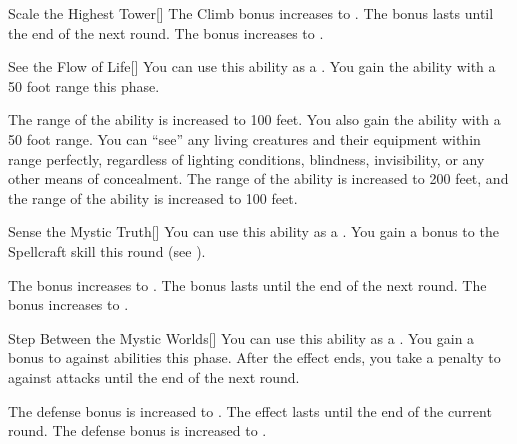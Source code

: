 {\begin{freeability}{Scale the Highest Tower}[]
                \rankline
                 The Climb bonus increases to .
                 The bonus lasts until the end of the next round.
                 The bonus increases to .
            \end{freeability}

            \begin{freeability}{See the Flow of Life}[]
                You can use this ability as a .
                You gain the  ability with a 50 foot range this phase.

                \rankline
                 The range of the  ability is increased to 100 feet.
                 You also gain the  ability with a 50 foot range.
                You can ``see'' any living creatures and their equipment within range perfectly, regardless of lighting conditions, blindness, invisibility, or any other means of concealment.
                 The range of the  ability is increased to 200 feet, and the range of the  ability is increased to 100 feet.
            \end{freeability}

            \begin{freeability}{Sense the Mystic Truth}[]
                You can use this ability as a .
                You gain a  bonus to the Spellcraft skill this round (see ).

                \rankline
                 The bonus increases to .
                 The bonus lasts until the end of the next round.
                 The bonus increases to .
            \end{freeability}

            \begin{freeability}{Step Between the Mystic Worlds}[]
                You can use this ability as a .
                You gain a  bonus to  against  abilities this phase.
                After the effect ends, you take a  penalty to  against  attacks until the end of the next round.

                \rankline
                 The defense bonus is increased to .
                 The effect lasts until the end of the current round.
                 The defense bonus is increased to .
            \end{freeability}

}
